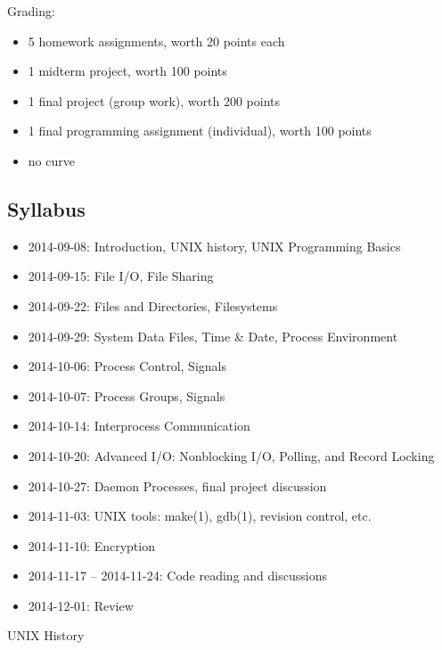 \documentclass[xga]{xdvislides}
\begin{document}
Grading:
\begin{itemize}
	\item 5 homework assignments, worth 20 points each
	\item 1 midterm project, worth 100 points
	\item 1 final project (group work), worth 200 points
	\item 1 final programming assignment (individual), worth 100 points
	\item no curve
\end{itemize}

\subsection{Syllabus}
\begin{itemize}
	\item 2014-09-08: Introduction, UNIX history, UNIX Programming Basics
	\item 2014-09-15: File I/O, File Sharing
	\item 2014-09-22: Files and Directories, Filesystems
	\item 2014-09-29: System Data Files, Time \& Date, Process Environment
	\item 2014-10-06: Process Control, Signals
	\item 2014-10-07: Process Groups, Signals
	\item 2014-10-14: Interprocess Communication
	\item 2014-10-20: Advanced I/O: Nonblocking I/O, Polling, and Record Locking
	\item 2014-10-27: Daemon Processes, final project discussion
	\item 2014-11-03: UNIX tools: make(1), gdb(1), revision control, etc.
	\item 2014-11-10: Encryption
	\item 2014-11-17 -- 2014-11-24: Code reading and discussions
	\item 2014-12-01: Review
\end{itemize}

\pagebreak

\vspace*{\fill}
\begin{center}
  \Hugesize
    UNIX History
	\hspace*{5mm}\blueline\\ [1em]
  \Normalsize
\end{center}
\vspace*{\fill}
\end{document}
